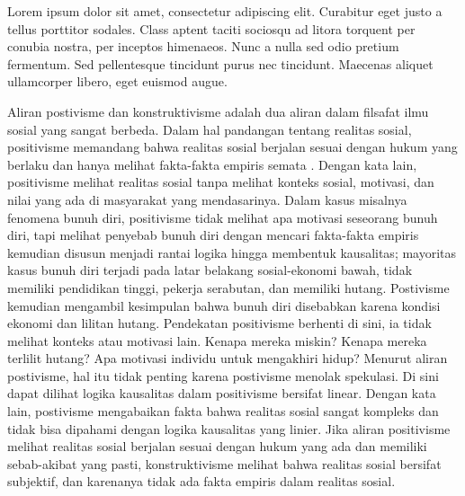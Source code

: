 \question
Lorem ipsum dolor sit amet, consectetur adipiscing elit. Curabitur eget justo a tellus porttitor 
sodales. Class aptent taciti sociosqu ad litora torquent per conubia nostra, per inceptos himenaeos. 
Nunc a nulla sed odio pretium fermentum. Sed pellentesque tincidunt purus nec tincidunt. Maecenas 
aliquet ullamcorper libero, eget euismod augue.
\begin{solution}
	Aliran postivisme dan konstruktivisme adalah dua aliran dalam filsafat ilmu sosial yang sangat berbeda. Dalam hal pandangan tentang realitas sosial, positivisme memandang bahwa realitas sosial berjalan sesuai dengan hukum yang berlaku dan hanya melihat fakta-fakta empiris semata \cite{armstrong_positivism_2013}.
	Dengan kata lain, positivisme melihat realitas sosial tanpa melihat konteks sosial, motivasi, dan nilai yang ada di masyarakat yang mendasarinya.
	Dalam kasus misalnya fenomena bunuh diri, positivisme tidak melihat apa motivasi seseorang bunuh diri, tapi melihat penyebab bunuh diri dengan mencari fakta-fakta empiris kemudian disusun menjadi rantai logika hingga membentuk kausalitas; mayoritas kasus bunuh diri terjadi pada latar belakang sosial-ekonomi bawah, tidak memiliki pendidikan tinggi, pekerja serabutan, dan memiliki hutang.
	Postivisme kemudian mengambil kesimpulan bahwa bunuh diri disebabkan karena kondisi ekonomi dan lilitan hutang.
	Pendekatan positivisme berhenti di sini, ia tidak melihat konteks atau motivasi lain.
	Kenapa mereka miskin? Kenapa mereka terlilit hutang? Apa motivasi individu untuk mengakhiri hidup?
	Menurut aliran postivisme, hal itu tidak penting karena postivisme menolak spekulasi.
	Di sini dapat dilihat logika kausalitas dalam positivisme bersifat linear.
	Dengan kata lain, postivisme mengabaikan fakta bahwa realitas sosial sangat kompleks dan tidak bisa dipahami dengan logika kausalitas yang linier.
	Jika aliran positivisme melihat realitas sosial berjalan sesuai dengan hukum yang ada dan memiliki sebab-akibat yang pasti, konstruktivisme melihat bahwa realitas sosial bersifat subjektif, dan karenanya tidak ada fakta empiris dalam realitas sosial.
	

\end{solution}
